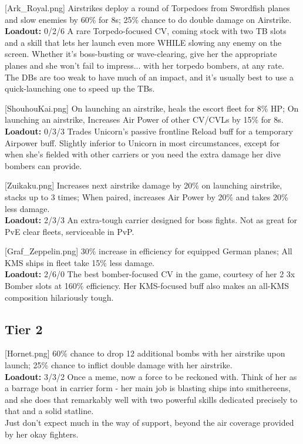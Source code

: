 [Ark_Royal.png]
{Airstrikes deploy a round of Torpedoes from Swordfish planes and slow enemies by 60\% for 8s; 25\% chance to do double damage on Airstrike.\\
\textbf{Loadout:} 0/2/6}
{}
{A rare Torpedo-focused CV, coming stock with two TB slots and a skill that lets her launch even more WHILE slowing any enemy on the screen. Whether it's boss-busting or wave-clearing, give her the appropriate planes and she won't fail to impress... with her torpedo bombers, at any rate. The DBs are too weak to have much of an impact, and it's usually best to use a quick-launching one to speed up the TBs.}
 
[ShouhouKai.png]
{ On launching an airstrike, heals the escort fleet for 8\% HP; On launching an airstrike, Increases Air Power of other CV/CVLs by 15\% for 8s.\\
\textbf{Loadout:} 0/3/3}
{}
{Trades Unicorn's passive frontline Reload buff for a temporary Airpower buff. Slightly inferior to Unicorn in most circumstances, except for when she's fielded with other carriers or you need the extra damage her dive bombers can provide.}

[Zuikaku.png]
{Increases next airstrike damage by 20\% on launching airstrike, stacks up to 3 times; When paired, increases Air Power by 20\% and takes 20\% less damage.\\
\textbf{Loadout:} 2/3/3}
{}
{An extra-tough carrier designed for boss fights. Not as great for PvE clear fleets, serviceable in PvP.}

[Graf_Zeppelin.png]
{30\% increase in efficiency for equipped German planes; All KMS ships in fleet take 15\% less damage.\\
\textbf{Loadout:} 2/6/0}
{}
{The best bomber-focused CV in the game, courtesy of her 2 3x Bomber slots at 160\% efficiency. Her KMS-focused buff also makes an all-KMS composition hilariously tough.}
 
 
\newpage
\subsection{Tier 2}
[Hornet.png]
{60\% chance to drop 12 additional bombs with her airstrike upon launch; 25\% chance to inflict double damage with her airstrike.\\
\textbf{Loadout:} 3/3/2}
{}
{Once a meme, now a force to be reckoned with. Think of her as a barrage boat in carrier form - her main job is blasting ships into smithereens, and she does that remarkably well with two powerful skills dedicated precisely to that and a solid statline. \\
Just don't expect much in the way of support, beyond the air coverage provided by her okay fighters.}

